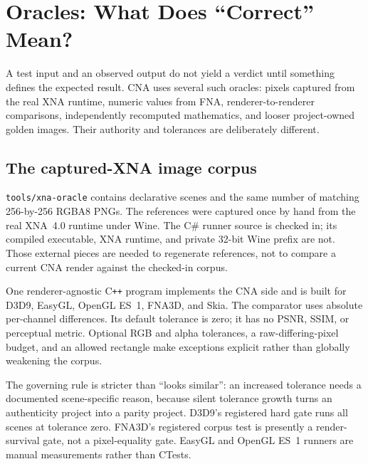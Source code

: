 \chapter{Oracles: What Does ``Correct'' Mean?}
\label{ch:oracles}
\label{ch:testing-philosophy}

A test input and an observed output do not yield a verdict until something defines the expected
result.  CNA uses several such oracles: pixels captured from the real XNA runtime, numeric values
from FNA, renderer-to-renderer comparisons, independently recomputed mathematics, and looser
project-owned golden images.  Their authority and tolerances are deliberately different.



\section{The captured-XNA image corpus}

\texttt{tools/xna-oracle} contains \XnaOracleSceneCount{} declarative scenes and the same number
of matching 256-by-256 RGBA8 PNGs.
The references were captured once by hand from the real XNA~4.0 runtime under Wine.  The C\#
runner source is checked in; its compiled executable, XNA runtime, and private 32-bit Wine prefix
are not.  Those external pieces are needed to regenerate references, not to compare a current CNA
render against the checked-in corpus.

One renderer-agnostic C\texttt{++} program implements the CNA side and is built for D3D9,
EasyGL, OpenGL ES~1, FNA3D, and Skia.  The comparator uses absolute per-channel differences.  Its
default tolerance is zero; it has no PSNR, SSIM, or perceptual metric.  Optional RGB and alpha
tolerances, a raw-differing-pixel budget, and an allowed rectangle make exceptions explicit
rather than globally weakening the corpus.

The governing rule is stricter than ``looks similar'': an increased tolerance needs a documented
scene-specific reason, because silent tolerance growth turns an authenticity project into a
parity project. D3D9's registered hard gate runs all \XnaOracleSceneCount{} scenes at tolerance
zero. FNA3D's
registered corpus test is presently a render-survival gate, not a pixel-equality gate.  EasyGL
and OpenGL ES~1 runners are manual measurements rather than CTests.

